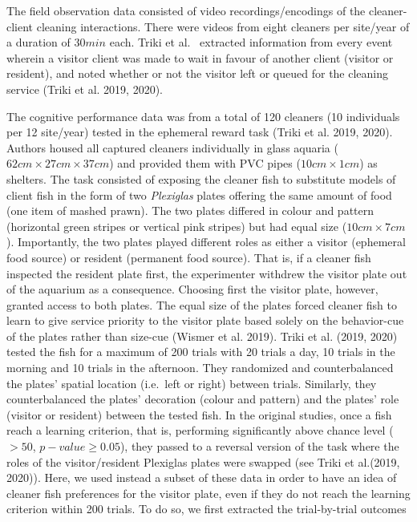 \documentclass[
  12pt,
]{article}
\begin{document}
The field observation data consisted of video recordings/encodings of
the cleaner-client cleaning interactions. There were videos from eight
cleaners per site/year of a duration of \(30 min\) each. Triki et al.~
extracted information from every event wherein a visitor client was made
to wait in favour of another client (visitor or resident), and noted
whether or not the visitor left or queued for the cleaning service
(Triki et al. 2019, 2020).

The cognitive performance data was from a total of 120 cleaners (10
individuals per 12 site/year) tested in the ephemeral reward task (Triki
et al. 2019, 2020). Authors housed all captured cleaners individually in
glass aquaria (\(62cm \times 27cm \times 37 cm\)) and provided them with
PVC pipes (\(10 cm \times 1 cm\)) as shelters. The task consisted of
exposing the cleaner fish to substitute models of client fish in the
form of two \emph{Plexiglas} plates offering the same amount of food
(one item of mashed prawn). The two plates differed in colour and
pattern (horizontal green stripes or vertical pink stripes) but had
equal size (\(10 cm \times 7 cm\)). Importantly, the two plates played
different roles as either a visitor (ephemeral food source) or resident
(permanent food source). That is, if a cleaner fish inspected the
resident plate first, the experimenter withdrew the visitor plate out of
the aquarium as a consequence. Choosing first the visitor plate,
however, granted access to both plates. The equal size of the plates
forced cleaner fish to learn to give service priority to the visitor
plate based solely on the behavior-cue of the plates rather than
size-cue (Wismer et al. 2019). Triki et al. (2019, 2020) tested the fish
for a maximum of 200 trials with 20 trials a day, 10 trials in the
morning and 10 trials in the afternoon. They randomized and
counterbalanced the plates' spatial location (i.e.~left or right)
between trials. Similarly, they counterbalanced the plates' decoration
(colour and pattern) and the plates' role (visitor or resident) between
the tested fish. In the original studies, once a fish reach a learning
criterion, that is, performing significantly above chance level (\(> 50%
\), \(p-value ≥ 0.05\)), they passed to a reversal version of the task
where the roles of the visitor/resident Plexiglas plates were swapped
(see Triki et al.(2019, 2020)). Here, we used instead a subset of these
data in order to have an idea of cleaner fish preferences for the
visitor plate, even if they do not reach the learning criterion within
200 trials. To do so, we first extracted the trial-by-trial outcomes
\end{document}
